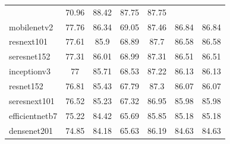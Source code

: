 \begin{table}[H]
\begin{tabular}{lcccccc}
                                            & 70.96              & 88.42 &
        87.75                               & 87.75
        \\
        mobilenetv2                         & 77.76              & 86.34
                                            & 69.05              & 87.46 &
        86.84                               & 86.84
        \\
        resnext101                          & 77.61              & 85.9
                                            & 68.89              & 87.7  &
        86.58                               & 86.58
        \\
        seresnet152                         & 77.31              & 86.01
                                            & 68.99              & 87.31 &
        86.51                               & 86.51
        \\
        inceptionv3                         & 77                 & 85.71
                                            & 68.53              & 87.22 &
        86.13                               & 86.13
        \\
        resnet152                           & 76.81              & 85.43
                                            & 67.79              & 87.3  &
        86.07                               & 86.07
        \\
        seresnext101                        & 76.52              & 85.23
                                            & 67.32              & 86.95 &
        85.98                               & 85.98
        \\
        efficientnetb7                      & 75.22              & 84.42
                                            & 65.69              & 85.85 &
        85.18                               & 85.18
        \\
        densenet201                         & 74.85              & 84.18
                                            & 65.63              & 86.19 &
        84.63                               & 84.63
        \\ \bottomrule
    \end{tabular}%

\end{table}